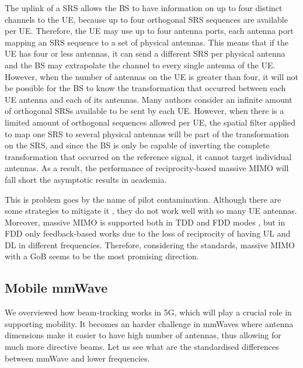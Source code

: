 The uplink of a \ac{SRS} allows the BS to have information on up to four distinct channels to the UE, because up to four orthogonal SRS sequences are available per UE. Therefore, the UE may use up to four antenna ports, each antenna port mapping an SRS sequence to a set of physical antennas. This means that if the UE has four or less antennas, it can send a different SRS per physical antenna and the BS may extrapolate the channel to every single antenna of the UE. However, when the number of antennas on the UE is greater than four, it will not be possible for the BS to know the transformation that occurred between each UE antenna and each of its antennas. Many authors \cite{7504159} consider an infinite amount of orthogonal SRSs available to be sent by each UE. However, when there is a limited amount of orthogonal sequences allowed per UE, the spatial filter applied to map one SRS to several physical antennas will be part of the transformation on the SRS, and since the BS is only be capable of inverting the complete transformation that occurred on the reference signal, it cannot target individual antennas. As a result, the performance of reciprocity-based massive MIMO will fall short the asymptotic results in academia.

This is problem goes by the name of pilot contamination. Although there are some strategies to mitigate it \cite{8094949, 7996674}, they do not work well with so many UE antennas. Moreover, massive MIMO is supported both in \ac{TDD} and \ac{FDD} modes \cite{8255833}, but in \ac{FDD} only feedback-based works due to the loss of reciprocity of having \ac{UL} and \ac{DL} in different frequencies. Therefore, considering the standards, massive MIMO with a GoB seems to be the most promising direction.



\subsection*{Mobile mmWave}

We overviewed how beam-tracking works in 5G, which will play a crucial role in supporting mobility. It becomes an harder challenge in mmWaves where antenna dimensions make it easier to have high number of antennas, thus allowing for much more directive beams. Let us see what are the standardised differences between mmWave and lower frequencies. 

